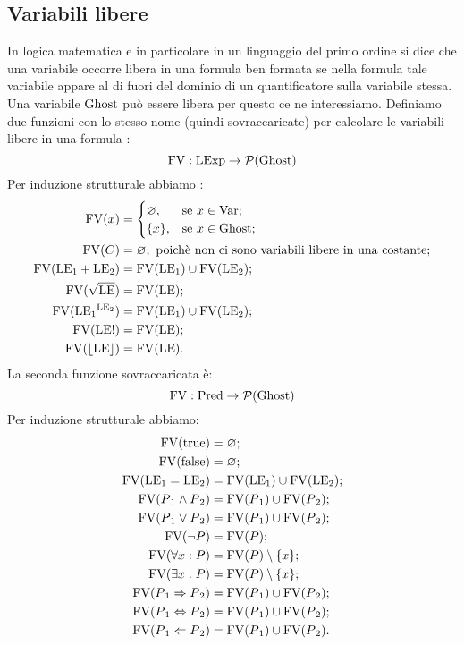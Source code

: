 \subsection{Variabili libere}
In logica matematica e in particolare in un linguaggio del primo ordine si dice che una variabile occorre libera in una formula ben formata se nella formula tale variabile appare al di fuori del dominio di un quantificatore sulla variabile stessa. Una variabile $\mathrm{Ghost}$ può essere libera per questo ce ne interessiamo.
Definiamo due funzioni con lo stesso nome (quindi sovraccaricate) per calcolare le variabili libere in una formula :
$$\mathrm{FV}\mathrel{:}\mathrm{LExp} \rightarrow \mathcal{P}(\mathrm{Ghost})$$
Per induzione strutturale abbiamo :
\begin{align*}
   \mathrm{FV}(x) 
      &= 
        \begin{cases}
            \varnothing,&\text{se $x  \in \mathrm{Var}$};\\
            \{x\},    &\text{se $x  \in \mathrm{Ghost}$};
        \end{cases} \\
   \mathrm{FV}( C) 
      &= \varnothing,\text{ poichè non ci sono variabili libere in una costante};\\
   \mathrm{FV}(\mathrm{LE}{_1} + \mathrm{LE}{_2}) 
      &= \mathrm{FV}(\mathrm{LE}{_1}) \cup \mathrm{FV}(\mathrm{LE}{_2});\\
   \mathrm{FV}(\sqrt{\mathrm{LE}}) 
      &= \mathrm{FV}(\mathrm{LE});\\
   \mathrm{FV}(\mathrm{LE}{_1}^{\mathrm{LE}_2}) 
      &= \mathrm{FV}(\mathrm{LE}{_1}) \cup \mathrm{FV}(\mathrm{LE}_2);\\
   \mathrm{FV}(\mathrm{LE}!) 
      &= \mathrm{FV}(\mathrm{LE});\\
   \mathrm{FV}(\lfloor \mathrm{LE} \rfloor) 
      &= \mathrm{FV}(\mathrm{LE}).
\end{align*}
La seconda funzione sovraccaricata è:
$$\mathrm{FV}\mathrel{:}\mathrm{Pred}\rightarrow\mathcal{P}(\mathrm{Ghost})$$
Per induzione strutturale abbiamo:
\begin{align*}
   \mathrm{FV}(\mathrm{true}) 
      &= \varnothing;\\
   \mathrm{FV}(\mathrm{false}) 
      &= \varnothing;\\
   \mathrm{FV}(\mathrm{LE}{_1} = \mathrm{LE}{_2}) 
      &= \mathrm{FV}(\mathrm{LE}{_1}) \cup \mathrm{FV}(\mathrm{LE}{_2});\\
   \mathrm{FV}(P{_1} \wedge P{_2}) 
      &= \mathrm{FV}(P{_1}) \cup \mathrm{FV}(P{_2});\\
   \mathrm{FV}(P{_1} \vee P{_2}) 
      &= \mathrm{FV}(P{_1}) \cup \mathrm{FV}(P{_2});\\
   \mathrm{FV}(\neg P) 
      &= \mathrm{FV}(P);\\
   \mathrm{FV}(\forall x \mathrel{:} P) 
      &= \mathrm{FV}(P)\setminus \{x\};\\
   \mathrm{FV}(\exists x \mathrel{.} P) 
      &= \mathrm{FV}(P)\setminus \{x\};\\
   \mathrm{FV}(P{_1} \Rightarrow P{_2}) 
      &= \mathrm{FV}(P{_1}) \cup \mathrm{FV}(P{_2});\\
   \mathrm{FV}(P{_1} \Leftrightarrow P{_2}) 
      &= \mathrm{FV}(P{_1}) \cup \mathrm{FV}(P{_2});\\
   \mathrm{FV}(P{_1} \Leftarrow P{_2}) 
      &= \mathrm{FV}(P{_1}) \cup \mathrm{FV}(P{_2}).
\end{align*}
